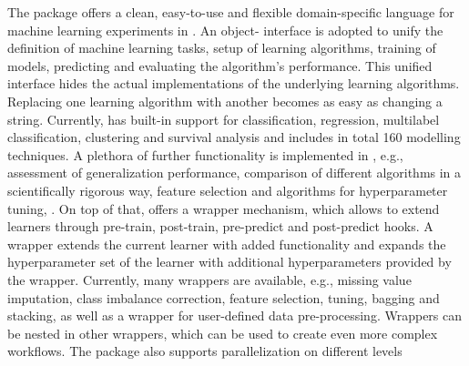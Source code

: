 The  package \citep{JMLR:v17:15-066, schiffner2016mlr} offers a clean, easy-to-use and flexible
domain-specific language for machine learning experiments in . An
object- interface is adopted to unify the definition of machine
learning tasks, setup of learning algorithms, training of models, predicting
and evaluating the algorithm's performance. This unified interface hides the
actual implementations of the underlying learning algorithms. Replacing one
learning algorithm with another becomes as easy as changing a string. Currently,
 has built-in support for classification,
regression, multilabel classification, clustering and survival analysis and includes in total 160 modelling techniques.
A plethora of further functionality is implemented in , e.g., assessment of
generalization performance, comparison of different algorithms in a
scientifically rigorous way, feature selection and algorithms for hyperparameter tuning,
.
On top of that,  offers a wrapper mechanism, which
allows to extend learners through pre-train, post-train, pre-predict and
post-predict hooks. A wrapper extends the current learner with added
functionality and expands the hyperparameter set of the learner with additional
hyperparameters provided by the wrapper. Currently, many wrappers are
available, e.g., missing value imputation, class imbalance correction,
feature selection, tuning, bagging and stacking, as well as a wrapper for
user-defined data pre-processing. Wrappers can be nested in other
wrappers, which can be used to create even more complex workflows.
The package also supports parallelization on different levels

